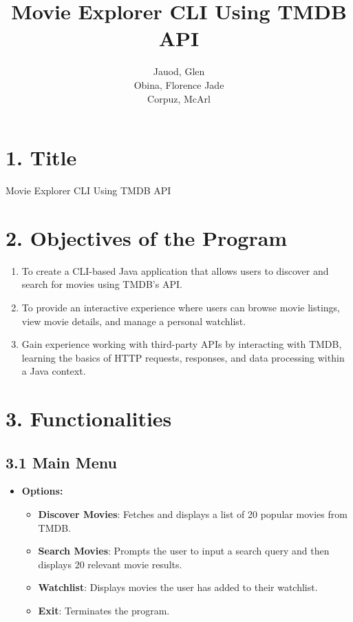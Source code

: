 \documentclass[11pt]{article}
\title{Movie Explorer CLI Using TMDB API}
\author{
  Jauod, Glen \\
  Obina, Florence Jade \\
  Corpuz, McArl \\
}
\date{} %
\begin{document}
\maketitle

\section*{1. Title}
Movie Explorer CLI Using TMDB API

\section*{2. Objectives of the Program}
\begin{enumerate}[label=\arabic*.]
    \item To create a CLI-based Java application that allows users to discover and search for movies using TMDB's API.
    \item To provide an interactive experience where users can browse movie listings, view movie details, and manage a personal watchlist.
    \item Gain experience working with third-party APIs by interacting with TMDB, learning the basics of HTTP requests, responses, and data processing within a Java context.
\end{enumerate}

\section*{3. Functionalities}
\subsection*{3.1 Main Menu}
\begin{itemize}
    \item \textbf{Options:}
    \begin{itemize}
        \item \textbf{Discover Movies}: Fetches and displays a list of 20 popular movies from TMDB.
        \item \textbf{Search Movies}: Prompts the user to input a search query and then displays 20 relevant movie results.
        \item \textbf{Watchlist}: Displays movies the user has added to their watchlist.
        \item \textbf{Exit}: Terminates the program.
    \end{itemize}
\end{itemize}
\end{document}
